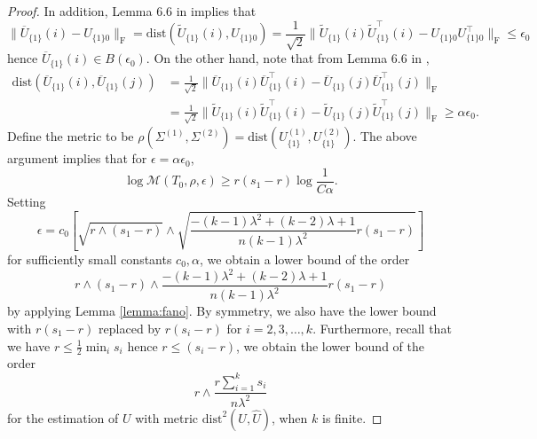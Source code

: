 \documentclass[11pt]{article}
\newcommand{\tilU}{\widetilde{U}}
\newcommand{\barU}{\overline{U}}
\newcommand{\dc}[1]{\{#1\}} %
\newcommand{\dist}{\mathrm{dist}}
\newcommand{\0}{{\mathbf{0}}}
\begin{document}
\begin{proof}
In addition, Lemma 6.6 in \cite{gao2017sparse} implies that \begin{equation*}
   \|\barU_{\dc{1}}(i)- U_{\dc{1}0}\|_\mathrm{F} = \dist\left(\tilU_{\dc{1}}(i), U_{\dc{1}0}\right) = \frac{1}{\sqrt{2}}\|\tilU_{\dc{1}}(i)\tilU_{\dc{1}}^\top(i) - U_{\dc{1}0}U_{\dc{1}0}^\top\|_\mathrm{F}\leq \epsilon_0
\end{equation*}
hence $\barU_{\dc{1}}(i)\in B(\epsilon_0)$. On the other hand, note that from Lemma 6.6 in \cite{gao2017sparse},
\begin{align*}
    \dist\left(\barU_{\dc{1}}(i), \barU_{\dc{1}}(j)\right)&= \frac{1}{\sqrt{2}}\|\barU_{\dc{1}}(i)\barU_{\dc{1}}^\top(i) - \barU_{\dc{1}}(j)\barU_{\dc{1}}^\top(j)\|_\mathrm{F}\\&= \frac{1}{\sqrt{2}}\|\tilU_{\dc{1}}(i)\tilU_{\dc{1}}^\top(i) - \tilU_{\dc{1}}(j)\tilU_{\dc{1}}^\top(j)\|_\mathrm{F}\geq \alpha\epsilon_0.
\end{align*}
Define the metric to be $\rho(\Sigma^{(1)}, \Sigma^{(2)}) = \dist\left(U_{\dc{1}}^{(1)}, U_{\dc{1}}^{(2)}\right)$. The above argument implies that for $\epsilon = \alpha \epsilon_0$,\begin{equation*}
    \log \mathcal{M}(T_0, \rho, \epsilon)\geq r(s_1-r)\log \frac{1}{C\alpha}.
\end{equation*}
Setting \begin{equation*}
    \epsilon = c_0\left[\sqrt{r\wedge (s_1-r)}\wedge \sqrt{\frac{-(k-1)\lambda^2+(k-2)\lambda+1}{n(k-1)\lambda^2}r(s_1-r)}\right]
\end{equation*}
for sufficiently small constants $c_0, \alpha$, we obtain a lower bound of the order \begin{equation*}
    r \wedge (s_1-r) \wedge \frac{-(k-1)\lambda^2+(k-2)\lambda+1}{n(k-1)\lambda^2}r(s_1-r)
\end{equation*}
by applying Lemma \ref{lemma:fano}. By symmetry, we also have the lower bound with $r(s_1-r)$ replaced by $r(s_i-r)$ for $i=2, 3, \dots, k$. Furthermore, recall that we have $r\leq \frac{1}{2}\min_i s_i$ hence $r\leq (s_i-r)$, we obtain the lower bound of the order \begin{equation*}
    r\wedge \frac{r\sum_{i=1}^k s_i}{n\lambda^2}
\end{equation*}
for the estimation of $U$ with metric $\dist^2(U, \widehat{U})$, when $k$ is finite. 


\end{proof}
\end{document}
